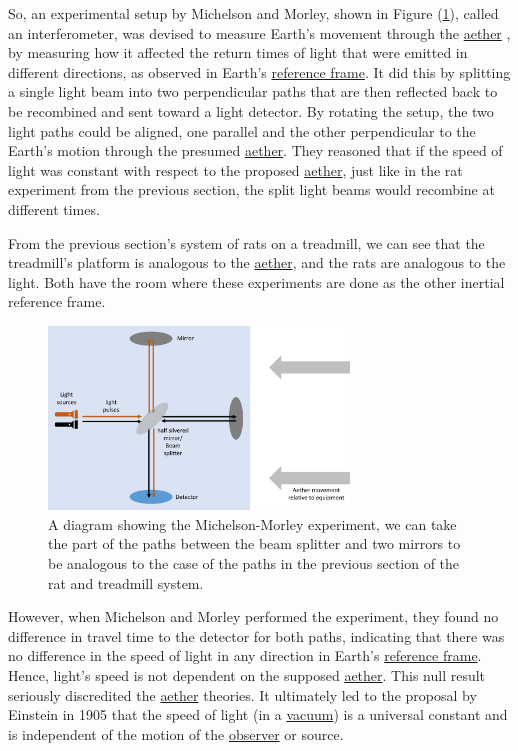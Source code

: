 So, an experimental setup by Michelson and Morley, shown in Figure (\ref{fig: Michelson_morley}), called an interferometer, was devised to measure Earth's movement through the \hyperlink{def-aether}{aether} \cite{EtherExperiment}, by measuring how it affected the return times of light that were emitted in different directions, as observed in Earth's \hyperlink{def-Reference-frame}{reference frame}.
It did this by splitting a single light beam into two perpendicular paths that are then reflected back to be recombined and sent toward a light detector.
By rotating the setup, the two light paths could be aligned, one parallel and the other perpendicular to the Earth's motion through the presumed \hyperlink{def-aether}{aether}.
They reasoned that if the speed of light was constant with respect to the proposed \hyperlink{def-aether}{aether}, just like in the rat experiment from the previous section, the split light beams would recombine at different times.

From the previous section's system of rats on a treadmill, we can see that the treadmill's platform is analogous to the \hyperlink{def-aether}{aether}, and the rats are analogous to the light.
Both have the room where these experiments are done as the other inertial reference frame.

\begin{figure}[H]
	\centering
	\includegraphics[width = 8cm]{images/pdf/Michelson_morley.pdf}
	\caption{A diagram showing the Michelson-Morley experiment, we can take the part of the paths between the beam splitter and two mirrors to be analogous to the case of the paths in the previous section of the rat and treadmill system.}
	\label{fig: Michelson_morley}
\end{figure}

However, when Michelson and Morley performed the experiment, they found no difference in travel time to the detector for both paths, indicating that there was no difference in the speed of light in any direction in Earth's \hyperlink{def-Reference-frame}{reference frame}.
Hence, light's speed is not dependent on the supposed \hyperlink{def-aether}{aether}.
This null result seriously discredited the \hyperlink{def-aether}{aether} theories.
It ultimately led to the proposal by Einstein in 1905 that the speed of light (in a \hyperlink{def-vacuum}{vacuum}) is a universal constant and is independent of the motion of the \hyperlink{def-observer}{observer} or source.

